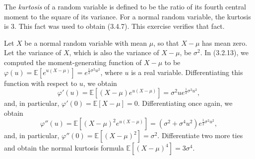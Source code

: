 \documentclass[11pt]{article}
\newcommand\E{\mathbb{E}}
\newcounter{question}[section]
\begin{document}
    \begin{hwquestion}
        The \emph{kurtosis} of a random variable is defined to be the ratio of its fourth
        central moment to the square of its variance. For a normal random variable, the
        kurtosis is $3$. This fact was used to obtain (3.4.7). This exercise verifies that
        fact.

        Let $X$ be a normal random variable with mean $\mu$, so that $X - \mu$ has mean
        zero. Let the variance of $X$, which is also the variance of $X - \mu$, be
        $\sigma^2$. In (3.2.13), we computed the moment-generating function of $X - \mu$
        to be $\varphi(u) = \E[e^{u(X - \mu)}] = e^{\frac{1}{2}\sigma^2 u^2}$, where $u$
        is a real variable. Differentiating this function with respect to $u$, we obtain
        \[
            \varphi'(u)
            =
            \E\left[
                (X - \mu) e^{u(X - \mu)}
            \right]
            =
            \sigma^2 u e^{\frac{1}{2} \sigma^2 u^2},
        \]
        and, in particular, $\varphi'(0) = \E[X - \mu] = 0$. Differentiating once again,
        we obtain
        \[
            \varphi''(u)
            =
            \E\left[
                (X - \mu)^2 e^{u(X - \mu)}
            \right]
            =
            (\sigma^2 + \sigma^4 u^2) e^{\frac{1}{2}\sigma^2 u^2},
        \]
        and, in particular, $\varphi''(0) = \E[(X - \mu)^2] = \sigma^2$. Differentiate two
        more ties and obtain the normal kurtosis formula $\E[(X - \mu)^4] = 3 \sigma^4$.
    \end{hwquestion}
\end{document}
